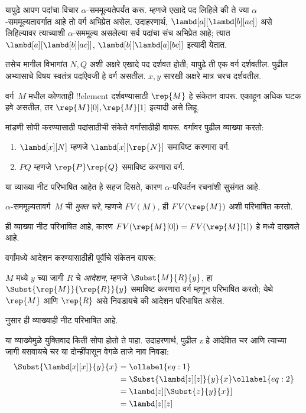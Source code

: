 \documentclass[../../../include/open-logic-section]{subfiles}
\begin{document}

यापुढे आपण पदांचा विचार $\alpha$-सममूल्यतेपर्यंत करू.
म्हणजे एखादे पद लिहिले की ते ज्या $\alpha$-सममूल्यतावर्गात
आहे तो वर्ग अभिप्रेत असेल. उदाहरणार्थ,
$\lambd[a][\lambd[b][a c]]$ असे लिहिल्यावर त्याच्याशी
$\alpha$-सममूल्य असलेल्या सर्व पदांचा संच अभिप्रेत आहे;
त्यात $\lambd[a][\lambd[b][a
    c]]$, $\lambd[b][\lambd[a][b c]]$ इत्यादी येतात.

तसेच मागील विभागांत $N, Q$ अशी अक्षरे एखादे पद
दर्शवत होती; यापुढे ती एक वर्ग दर्शवतील. पुढील अभ्यासाचे
विषय स्वतंत्र पदांऐवजी हे वर्ग असतील. $x, y$ सारखी
अक्षरे मात्र चरच दर्शवतील.

वर्ग~$M$ मधील कोणताही !!{element} दर्शवण्यासाठी
$\rep{M}$ हे संकेतन वापरू. एकाहून अधिक घटक हवे
असतील, तर $\rep{M}[0], \rep{M}[1]$ इत्यादी असे लिहू.

मांडणी सोपी करण्यासाठी पदांसाठीची संकेते वर्गांसाठीही
वापरू. वर्गांवर पुढील व्याख्या करतो:
\begin{defn}
  \begin{enumerate}
  \item $\lambd[x][N]$ म्हणजे $\lambd[x][\rep{N}]$
    समाविष्ट करणारा वर्ग.
  \item $PQ$ म्हणजे $\rep{P}\rep{Q}$ समाविष्ट करणारा वर्ग.
  \end{enumerate}
\end{defn}

या व्याख्या नीट परिभाषित आहेत हे सहज दिसते,
कारण $\alpha$-परिवर्तन रचनांशी सुसंगत आहे.

\begin{defn} 
  $\alpha$-सममूल्यतावर्ग~$M$ ची \emph{मुक्त चरे},
  म्हणजे $FV(M)$, ही $FV(\rep{M})$ अशी परिभाषित करतो.
\end{defn}

ही व्याख्या नीट परिभाषित आहे, कारण
$FV(\rep{M}[0]) =
FV(\rep{M}[1])$ हे  मध्ये दाखवले आहे.

वर्गांमध्ये आदेशन करण्यासाठीही पूर्वीचे संकेतन वापरू:
\begin{defn} 
  $M$ मध्ये $y$ च्या जागी $R$ चे \emph{आदेशन}, म्हणजे
  $\Subst{M}{R}{y}$, हा $\Subst{\rep{M}}{\rep{R}}{y}$
  समाविष्ट करणारा वर्ग म्हणून परिभाषित करतो; येथे
  $\rep{M}$ आणि $\rep{R}$ असे निवडायचे की आदेशन
  परिभाषित असेल.
\end{defn}

 नुसार ही व्याख्याही नीट परिभाषित आहे.

या व्याख्येमुळे युक्तिवाद किती सोपा होतो ते पाहा.
उदाहरणार्थ, पुढील z हे आदेशित चर आणि त्याच्या जागी
बसवायचे चर या दोन्हींपासून वेगळे ताजे नाव निवडा:
\begin{align}
  \Subst{\lambd[x][x]}{y}{x} & =\ollabel{eq:1}\\
  &= \Subst{\lambd[z][z]}{y}{x} \ollabel{eq:2}\\
  &= \lambd[z][\Subst{z}{y}{x}] \\
  &= \lambd[z][z]
\end{align}
\end{document}
